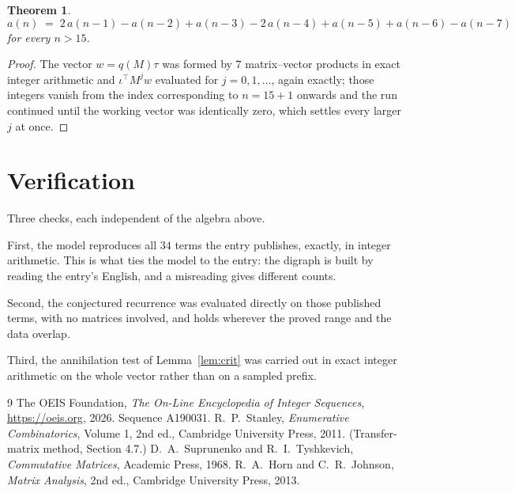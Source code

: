 \documentclass[11pt,a4paper]{article}
\theoremstyle{plain}
\newtheorem{theorem}{Theorem}
\theoremstyle{definition}
\begin{document}
\begin{theorem}
\[
a(n)\;=\;2\,a(n-1) - a(n-2) + a(n-3) - 2\,a(n-4) + a(n-5) + a(n-6) - a(n-7)
\]
for every $n>15$.
\end{theorem}

\begin{proof}
The vector $w=q(M)\tau$ was formed by $7$ matrix--vector products in exact integer
arithmetic and $\iota^{\!\top}M^{j}w$ evaluated for $j=0,1,\dots$, again exactly; those
integers vanish from the index corresponding to $n=15+1$ onwards and the run continued
until the working vector was identically zero, which settles every larger $j$ at once.
\end{proof}

\section{Verification}

Three checks, each independent of the algebra above.

First, the model reproduces all $34$ terms the entry publishes, exactly, in integer
arithmetic. This is what ties the model to the entry: the digraph is built by reading the
entry's English, and a misreading gives different counts.

Second, the conjectured recurrence was evaluated directly on those published terms, with no
matrices involved, and holds wherever the proved range and the data overlap.

Third, the annihilation test of Lemma~\ref{lem:crit} was carried out in exact integer
arithmetic on the whole vector rather than on a sampled prefix.

\begin{thebibliography}{9}
 The OEIS Foundation, \emph{The On-Line Encyclopedia of Integer
Sequences}, \url{https://oeis.org}, 2026. Sequence A190031.
 R.~P.~Stanley, \emph{Enumerative Combinatorics}, Volume 1, 2nd ed.,
Cambridge University Press, 2011. (Transfer-matrix method, Section 4.7.)
 D.~A.~Suprunenko and R.~I.~Tyshkevich, \emph{Commutative Matrices},
Academic Press, 1968.
 R.~A.~Horn and C.~R.~Johnson, \emph{Matrix Analysis}, 2nd ed., Cambridge
University Press, 2013.
\end{thebibliography}
\end{document}
